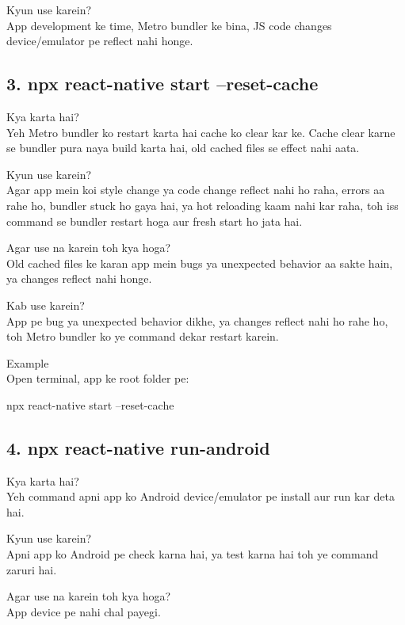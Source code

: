 \documentclass[a4paper]{article}
\newcommand\imp[1]{{\color{ImportantRed}#1}}
\begin{document}
\imp{Kyun use karein?}\\
App development ke time, Metro bundler ke bina, JS code changes device/emulator pe reflect nahi honge.

\vspace{0.9em}
\subsection*{3. npx react-native start --reset-cache}
\imp{Kya karta hai?}\\
Yeh Metro bundler ko restart karta hai \imp{cache ko clear kar ke}. Cache clear karne se bundler pura naya build karta hai, old cached files se effect nahi aata.

\imp{Kyun use karein?}\\
Agar app mein koi style change ya code change reflect nahi ho raha, errors aa rahe ho, bundler stuck ho gaya hai, ya hot reloading kaam nahi kar raha, toh iss command se bundler restart hoga aur fresh start ho jata hai.

\imp{Agar use na karein toh kya hoga?}\\
Old cached files ke karan app mein bugs ya unexpected behavior aa sakte hain, ya changes reflect nahi honge.

\imp{Kab use karein?}\\
App pe bug ya unexpected behavior dikhe, ya changes reflect nahi ho rahe ho, toh Metro bundler ko ye command dekar restart karein.

\imp{Example}\\
Open terminal, app ke root folder pe:

\begin{codeblock}
npx react-native start --reset-cache
\end{codeblock}

\vspace{0.9em}
\subsection*{4. npx react-native run-android}
\imp{Kya karta hai?}\\
Yeh command apni app ko Android device/emulator pe install aur run kar deta hai.

\imp{Kyun use karein?}\\
Apni app ko Android pe check karna hai, ya test karna hai toh ye command zaruri hai.

\imp{Agar use na karein toh kya hoga?}\\
App device pe nahi chal payegi.
\end{document}
